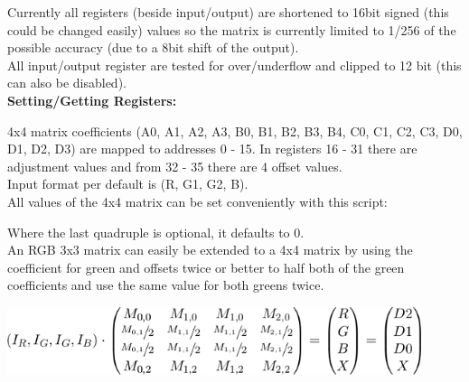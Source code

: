 Currently all registers (beside input/output) are shortened to 16bit signed (this could be changed easily) values so the matrix is currently limited to 1/256 of the possible accuracy (due to a 8bit shift of the output).\\

All input/output register are tested for over/underflow and clipped to 12 bit (this can also be disabled).\\ 

\textbf{Setting/Getting Registers: }\\


    
4x4 matrix coefficients (A0, A1, A2, A3, B0, B1, B2, B3, B4, C0, C1, C2, C3, D0, D1, D2, D3) are mapped to addresses 0 - 15. In registers 16 - 31 there are adjustment values and from 32 - 35 there are 4 offset values.\\

Input format per default is (R, G1, G2, B).\\

All values of the 4x4 matrix can be set conveniently with this script:\\

    
Where the last quadruple is optional, it defaults to 0.\\

An RGB 3x3 matrix can easily be extended to a 4x4 matrix by using the coefficient for green and offsets twice or better to half both of the green coefficients and use the same value for both greens twice. \\    
    
\begin{center}
\includegraphics[height=2cm]{images/Eqn5}
\end{center}
    
    
    
    
    
   

